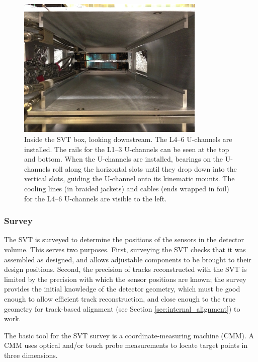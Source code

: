 \begin{figure}[htp]
    \begin{center}
    \includegraphics[width=0.8\textwidth]{detector/figs/drawers}
    \end{center}
    \caption{Inside the SVT box, looking downstream.
    The L4--6 U-channels are installed.
The rails for the L1--3 U-channels can be seen at the top and bottom. When the U-channels are installed, bearings on the U-channels roll along the horizontal slots until they drop down into the vertical slots, guiding the U-channel onto its kinematic mounts.
The cooling lines (in braided jackets) and cables (ends wrapped in foil) for the L4--6 U-channels are visible to the left.}
    \label{fig:drawers}
\end{figure}

\subsubsection{Survey}
\label{sec:svt_survey}

The SVT is surveyed to determine the positions of the sensors in the detector volume.
This serves two purposes.
First, surveying the SVT checks that it was assembled as designed, and allows adjustable components to be brought to their design positions.
Second, the precision of tracks reconstructed with the SVT is limited by the precision with which the sensor positions are known; the survey provides the initial knowledge of the detector geometry, which must be good enough to allow efficient track reconstruction, and close enough to the true geometry for track-based alignment (see Section \ref{sec:internal_alignment}) to work.

The basic tool for the SVT survey is a coordinate-measuring machine (CMM).
A CMM uses optical and/or touch probe measurements to locate target points in three dimensions.

